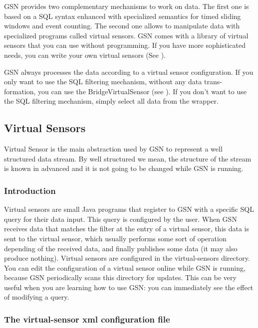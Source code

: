 GSN provides two complementary mechanisms to work on data.
The first one is based on a SQL syntax enhanced with specialized semantics
for timed sliding windows and event counting.
The second one allows to manipulate data with specialized programs called
virtual sensors. GSN comes with a library of virtual sensors that you can use
without programming. If you have more sophisticated needs, you can write your
own virtual sensors (See ).

GSN always processes the data according to a virtual sensor configuration.
If you only want to use the SQL filtering mechanism, without any data trans-
formation, you can use the BridgeVirtualSensor (see ).
If you don't want to use the SQL filtering mechanism, simply select all data
from the wrapper.

\subsection{Virtual Sensors}


Virtual Sensor is the main abstraction used by GSN to represent a well structured data stream.
By well structured we mean, the structure of the stream is known in advanced and it is not going to be changed
while GSN is running.
\subsubsection{Introduction}
Virtual sensors are small Java programs that register to GSN with a specific
SQL query for their data input. This query is configured by the user. When
GSN receives data that matches the filter at the entry of a virtual sensor, this
data is sent to the virtual sensor, which usually performs some sort of operation
depending of the received data, and finally publishes some data (it may also
produce nothing).
Virtual sensors are configured in the virtual-sensors directory. You can edit
the configuration of a virtual sensor online while GSN is running, because GSN
periodically scans this directory for updates. This can be very useful when you
are learning how to use GSN: you can immediately see the effect of modifying
a query.

\subsubsection{The virtual-sensor xml configuration file}

